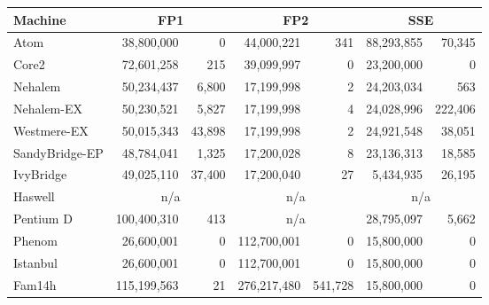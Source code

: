 
\begin{tabular}{|l||r@{$\pm$}r|r@{$\pm$}r|r@{$\pm$}r|}

\hline
Machine   & 
\multicolumn{2}{c|}{FP1} & 
\multicolumn{2}{c|}{FP2} & 
\multicolumn{2}{c|}{SSE} \\
\hline
\hline

Atom         &  38,800,000 &   0 & 44,000,221 & 341 & 88,293,855 & 70,345 \\
\hline
Core2        &  72,601,258 & 215 &  39,099,997 & 0 & 23,200,000 & 0   \\
\hline
Nehalem      &  50,234,437 & 6,800 &  17,199,998 & 2 & 24,203,034 & 563 \\
\hline
Nehalem-EX   &  50,230,521 & 5,827 &  17,199,998 & 4 & 24,028,996 & 222,406 \\
\hline
Westmere-EX  &  50,015,343 & 43,898 & 17,199,998 & 2  & 24,921,548 & 38,051 \\
\hline
SandyBridge-EP &  48,784,041 & 1,325 &  17,200,028 & 8 & 23,136,313 & 18,585 \\
\hline
IvyBridge    &  49,025,110 & 37,400 & 17,200,040 & 27 &  5,434,935 & 26,195  \\
\hline
Haswell		& \multicolumn{2}{c|}{n/a} & \multicolumn{2}{c|}{n/a} & \multicolumn{2}{c|}{n/a} \\
\hline
Pentium D    & 100,400,310 & 413 & \multicolumn{2}{c|}{n/a} & 28,795,097 & 5,662\\
\hline
Phenom       & 26,600,001 & 0  & 112,700,001 & 0 &  15,800,000 & 0\\
\hline
Istanbul     & 26,600,001 & 0  & 112,700,001 & 0 & 15,800,000 & 0 \\
\hline
Fam14h       & 115,199,563 & 21  & 276,217,480 & 541,728 & 15,800,000 & 0 \\
\hline
\end{tabular}
%

